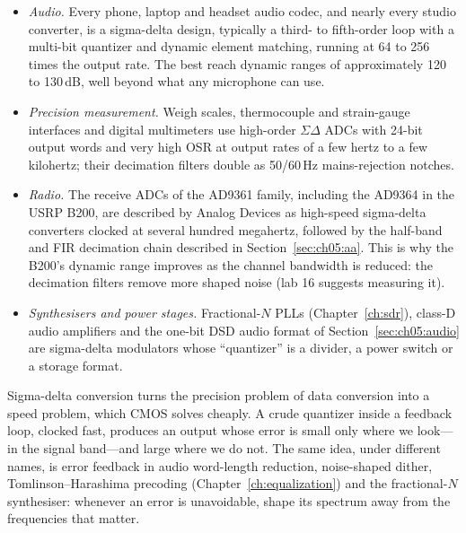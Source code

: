 \begin{inpractice}
\begin{itemize}
\item \emph{Audio.} Every phone, laptop and headset audio codec, and nearly every studio
converter, is a sigma-delta design, typically a third- to fifth-order loop with a multi-bit
quantizer and dynamic element matching, running at 64 to 256 times the output rate. The best
reach dynamic ranges of approximately 120 to 130\,dB, well beyond what any microphone can use.
\item \emph{Precision measurement.} Weigh scales, thermocouple and strain-gauge interfaces and
digital multimeters use high-order $\Sigma\Delta$ ADCs with 24-bit output words and very high
OSR at output rates of a few hertz to a few kilohertz; their decimation filters double as 50/60\,Hz
mains-rejection notches.
\item \emph{Radio.} The receive ADCs of the AD9361 family, including the AD9364 in the USRP
B200, are described by Analog Devices as high-speed sigma-delta converters clocked at several
hundred megahertz, followed by the half-band and FIR decimation chain described in
Section~\ref{sec:ch05:aa}. This is why the B200's dynamic range improves as the channel bandwidth
is reduced: the decimation filters remove more shaped noise (lab 16 suggests measuring it).
\item \emph{Synthesisers and power stages.} Fractional-$N$ PLLs (Chapter~\ref{ch:sdr}), class-D
audio amplifiers and the one-bit DSD audio format of Section~\ref{sec:ch05:audio} are sigma-delta
modulators whose ``quantizer'' is a divider, a power switch or a storage format.
\end{itemize}
\end{inpractice}


\begin{keyidea}
Sigma-delta conversion turns the precision problem of data conversion into a speed problem,
which CMOS solves cheaply. A crude quantizer inside a feedback loop, clocked fast, produces an
output whose error is small only where we look---in the signal band---and large where we do not.
The same idea, under different names, is error feedback in audio word-length reduction,
noise-shaped dither, Tomlinson--Harashima precoding (Chapter~\ref{ch:equalization}) and the
fractional-$N$ synthesiser: whenever an error is unavoidable, shape its spectrum away from the
frequencies that matter.
\end{keyidea}

